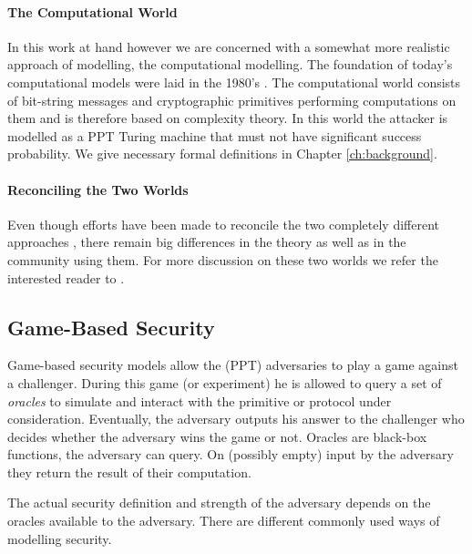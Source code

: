 \paragraph{The Computational World}
In this work at hand however we are concerned with a somewhat more realistic approach of modelling, the computational modelling.
The foundation of today's computational models were laid in the 1980's \cite{Goldwasser82,Goldwasser84,Yao82,Blum82}.
The computational world consists of bit-string messages and cryptographic primitives performing computations on them and is therefore based on complexity theory.
In this world the attacker is modelled as a \ac{PPT} Turing machine \cite{Turing37} that must not have significant success probability.
We give necessary formal definitions in Chapter \ref{ch:background}.
%

\paragraph{Reconciling the Two Worlds}
Even though efforts have been made to reconcile the two completely different approaches \cite{Abadi2002,Herzog2005}, there remain big differences in the theory as well as in the community using them.
For more discussion on these two worlds we refer the interested reader to \cite{cortier2011survey}.

\subsection{Game-Based Security}
Game-based security models allow the (\ac{PPT}) adversaries to play a game against a challenger.
During this game (or experiment) he is allowed to query a set of \emph{oracles} to simulate and interact with the primitive or protocol under consideration.
Eventually, the adversary outputs his answer to the challenger who decides whether the adversary wins the game or not.
Oracles are black-box functions, the adversary can query.
On (possibly empty) input by the adversary they return the result of their computation.

The actual security definition and strength of the adversary depends on the oracles available to the adversary.
There are different commonly used ways of modelling security.

